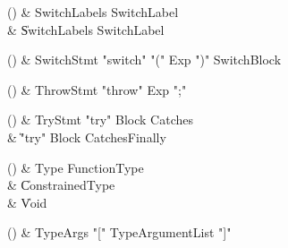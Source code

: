 \begin{bbgrammarappendix}{3.8in}

() & SwitchLabels \label{prod:SwitchLabels}  \: SwitchLabel  \\

 &    \| SwitchLabels SwitchLabel \\

\end{bbgrammarappendix}

\begin{bbgrammarappendix}{4.0in}

() & SwitchStmt \label{prod:SwitchStmt}  \: \xcd"switch" \xcd"(" Exp \xcd")" SwitchBlock  \\


\end{bbgrammarappendix}

\begin{bbgrammarappendix}{4.1in}

() & ThrowStmt \label{prod:ThrowStmt}  \: \xcd"throw" Exp \xcd";"  \\


\end{bbgrammarappendix}

\begin{bbgrammarappendix}{4.3in}

() & TryStmt \label{prod:TryStmt}  \: \xcd"try" Block Catches  \\

 &    \| \xcd"try" Block Catches\opt Finally \\

\end{bbgrammarappendix}

\begin{bbgrammarappendix}{4.6in}

() & Type \label{prod:Type}  \: FunctionType  \\

 &    \| ConstrainedType \\
 &    \| Void \\

\end{bbgrammarappendix}

\begin{bbgrammarappendix}{4.2in}

() & TypeArgs \label{prod:TypeArgs}  \: \xcd"[" TypeArgumentList \xcd"]"  \\


\end{bbgrammarappendix}

